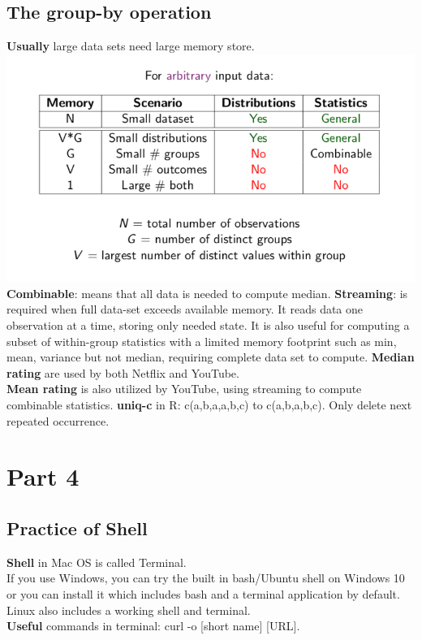 \subsection{The group-by operation}
\textbf{Usually} large data sets need large memory store. 
\begingroup\centering
\includegraphics{figures/dda}\\
\endgroup
\noindent\textbf{Combinable}: means that all data is needed to compute median.
\newline\textbf{Streaming}: is required when full data-set exceeds available memory. It reads data one observation at a time, storing only needed state. It is also useful for computing a subset of within-group statistics with a limited memory footprint such as min, mean, variance but not median, requiring complete data set to compute.
\newline\textbf{Median rating} are used by both Netflix and YouTube.\\
\textbf{Mean rating} is also utilized by YouTube, using streaming to compute combinable statistics.
\newline\textbf{uniq-c} in R: c(a,b,a,a,b,c) to c(a,b,a,b,c). Only delete next repeated occurrence.
\section{Part 4}
\subsection{Practice of Shell}
\textbf{Shell} in Mac OS is called Terminal. \\
If you use Windows, you can try the built in bash/Ubuntu shell on Windows 10 or you can install it which includes bash and a terminal application by default. Linux also includes a working shell and terminal.\\
\textbf{Useful} commands in terminal: curl -o [short name] [URL].
